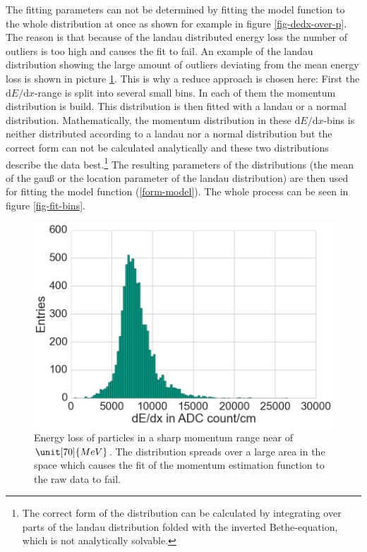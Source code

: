 The fitting parameters can not be determined by fitting the model function to the whole distribution at once as shown for example in figure \ref{fig-dedx-over-p}. The reason is that because of the landau distributed energy loss the number of outliers is too high and causes the fit to fail. An example of the landau distribution showing the large amount of outliers deviating from the mean energy loss is shown in picture \ref{fig-landau}. This is why a reduce approach is chosen here: First the $\mathrm d E / \mathrm d x$-range is split into several small bins. In each of them the momentum distribution is build. This distribution is then fitted with a landau or a normal distribution. Mathematically, the momentum distribution in these $\mathrm d E / \mathrm d x$-bins is neither distributed according to a landau nor a normal distribution but the correct form can not be calculated analytically and these two distributions describe the data best.\footnote{The correct form of the distribution can be calculated by integrating over parts of the landau distribution folded with the inverted Bethe-equation, which is not analytically solvable.} The resulting parameters of the distributions (the mean of the gauß or the location parameter of the landau distribution\cite{landau}) are then used for fitting the model function (\ref{form-model}). The whole process can be seen in figure \ref{fig-fit-bins}.

\begin{figure}
  \centering
  \includegraphics[width=0.7\linewidth]{figures/vxd/landau.png}
  \caption[Energy loss of particles in a sharp momentum range near of 70 MeV.]{Energy loss of particles in a sharp momentum range near of $\unit[70]{MeV}$. The distribution spreads over a large area in the \dedx space which causes the fit of the momentum estimation function to the raw data to fail.}
  \label{fig-landau}
\end{figure}

